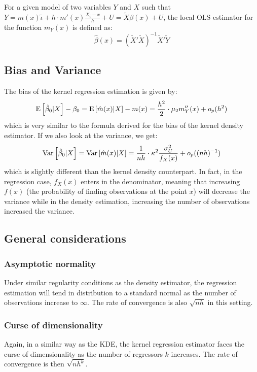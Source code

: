 \begin{definition}
For a given model of two variables $Y$ and $X$ such that $Y = m(x)\tilde\iota + h\cdot m'(x)\frac{X_i - x}{h} + U = \tilde X\beta (x) + U $, the local OLS estimator for the function $m_Y(x)$ is defined as:
$$\hat\beta(x) = (\tilde X'\tilde X)^{-1}\tilde X'\tilde Y $$
\end{definition}

\subsection{Bias and Variance}

The bias of the kernel regression estimation is given by: $$\operatorname{E}\left[\hat \beta_0\vert X\right] - \beta_0 = \operatorname{E}\left[\hat m(x)\vert X\right] - m(x) = \frac{h^2}{2} \cdot \mu_2 m_Y''(x) + o_p(h^2) $$ which is very similar to the formula derived for the bias of the kernel density estimator. If we also look at the variance, we get: $$\operatorname{Var}\left[\hat \beta_0\vert X\right] = \operatorname{Var}\left[\hat m(x)\vert X\right] = \frac{1}{nh}\cdot\kappa^2\frac{\sigma_U^2}{f_X(x)} + o_p((nh)^{-1}) $$ which is slightly different than the kernel density counterpart. In fact, in the regression case, $f_X(x)$ enters in the denominator, meaning that increasing $f(x)$ (the probability of finding observations at the point $x$) will decrease the variance while in the density estimation, increasing the number of observations increased the variance.

\subsection{General considerations}

\subsubsection{Asymptotic normality}

Under similar regularity conditions as the density estimator, the regression estimation will tend in distribution to a standard normal as the number of observations increase to $\infty$. The rate of convergence is also $\sqrt{nh}$ in this setting.

\subsubsection{Curse of dimensionality}

Again, in a similar way as the KDE, the kernel regression estimator faces the curse of dimensionality as the number of regressors $k$ increases. The rate of convergence is then $\sqrt{nh^k}$.


